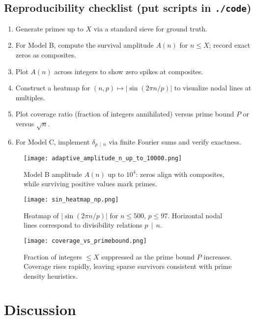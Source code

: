 \documentclass[12pt]{article}
\theoremstyle{definition}
\theoremstyle{remark}
\newcommand{\divides}{\,\mid\,}
\begin{document}
\subsection*{Reproducibility checklist (put scripts in \texttt{./code})}
\begin{enumerate}
  \item Generate primes up to $X$ via a standard sieve for ground truth.
  \item For Model B, compute the survival amplitude $A(n)$ for $n\le X$; record exact zeros as composites.
  \item Plot $A(n)$ across integers to show zero spikes at composites.
  \item Construct a heatmap for $(n,p) \mapsto |\sin(2\pi n/p)|$ to visualize nodal lines at multiples.
  \item Plot coverage ratio (fraction of integers annihilated) versus prime bound $P$ or versus $\sqrt{n}$.
  \item For Model C, implement $\delta_{p\divides n}$ via finite Fourier sums and verify exactness.
\end{enumerate}

\begin{figure}[h]
  \centering
  \texttt{[image: adaptive\_amplitude\_n\_up\_to\_10000.png]}
  \caption{Model B amplitude $A(n)$ up to $10^4$: zeros align with composites, while surviving positive values mark primes.}
  \label{fig:amplitude}
\end{figure}

\begin{figure}[h]
  \centering
  \texttt{[image: sin\_heatmap\_np.png]}
  \caption{Heatmap of $|\sin(2\pi n/p)|$ for $n\le 500$, $p\le 97$. Horizontal nodal lines correspond to divisibility relations $p\divides n$.}
  \label{fig:heatmap}
\end{figure}

\begin{figure}[h]
  \centering
  \texttt{[image: coverage\_vs\_primebound.png]}
  \caption{Fraction of integers $\le X$ suppressed as the prime bound $P$ increases. Coverage rises rapidly, leaving sparse survivors consistent with prime density heuristics.}
  \label{fig:coverage}
\end{figure}

\section{Discussion}
\end{document}
